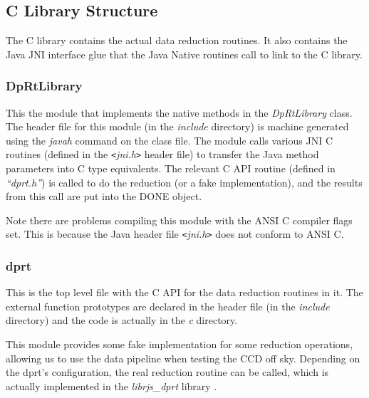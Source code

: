 \documentclass[10pt,a4paper]{article}
\begin{document}
\subsection{C Library Structure}
The C library contains the actual data reduction routines. It also contains the Java JNI interface glue that the 
Java Native routines call to link to the C library.

\subsubsection{DpRtLibrary}
This the module that implements the native methods in the {\em DpRtLibrary} class. The header file for this 
module (in the {\em include} directory) is machine generated using the {\em javah} command on the class file. 
The module calls various JNI C routines (defined in the {\em \verb'<'jni.h\verb'>'} header file) to 
transfer the Java method parameters into C type equivalents. 
The relevant C API routine (defined in {\em ``dprt.h''}) is called to
do the reduction (or a fake implementation), and the results from this call are put into the DONE object. 

Note there are problems compiling this module with the ANSI C compiler flags set. This is because the Java
header file {\em \verb'<'jni.h\verb'>'} does not conform to ANSI C.

\subsubsection{dprt}
This is the top level file with the C API for the data reduction routines in it. The external function
prototypes are declared in the header file (in the {\em include} directory) and the code is actually in the
{\em c} directory. 

This module provides some fake implementation for some reduction operations, allowing us to use the data
pipeline when testing the CCD off sky. Depending on the dprt's configuration, the real reduction routine
can be called, which is actually implemented in the {\em librjs\_dprt} library \cite{bib:rtp}.
\end{document}
